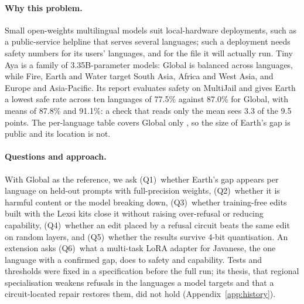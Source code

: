 \documentclass[11pt]{article}
\begin{document}
\paragraph{Why this problem.} Small open-weights multilingual models suit local-hardware deployments, such as a
public-service helpline that serves several languages; such a deployment needs safety numbers for its users'
languages, and for the file it will actually run. Tiny Aya \citep{salamanca2026tinyaya} is a family of 3.35B-parameter
models: Global is balanced across languages, while Fire, Earth and Water target South Asia, Africa
and West Asia, and Europe and Asia-Pacific. Its report evaluates safety on MultiJail \citep{deng2024multijail} and
gives Earth a lowest safe rate across ten languages of 77.5\% against 87.0\% for Global, with means of 87.8\% and 91.1\%: a check
that reads only the mean sees 3.3 of the 9.5 points. The per-language table covers Global only
\citep[Table~26]{salamanca2026tinyaya}, so the size of Earth's gap is public and its location is not.

\paragraph{Questions and approach.} With Global as the reference, we ask (Q1)~whether Earth's gap appears per
language on held-out prompts with full-precision weights, (Q2)~whether it is harmful content or the model breaking
down, (Q3)~whether training-free edits built with the Lexsi kits close it without raising over-refusal or reducing
capability, (Q4)~whether an edit placed by a refusal circuit beats the same edit on random layers, and (Q5)~whether
the results survive 4-bit quantisation. An extension asks (Q6)~what a multi-task LoRA adapter \citep{hu2021lora} for
Javanese, the one language with a confirmed gap, does to safety and capability. Tests and thresholds were fixed in a
specification before the full run; its thesis, that regional specialisation weakens refusals in the languages a
model targets and that a circuit-located repair restores them, did not hold (Appendix~\ref{app:history}).
\end{document}
